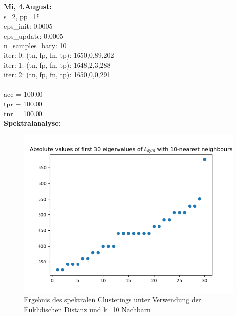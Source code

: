 \documentclass[twoside, 11pt,a4paper]{article}
\numberwithin{equation}{section}
\begin{document}
	
	
	\noindent \textbf{Mi, 4.August:}\\
	s=2, pp=15\\
	eps\_init: 0.0005\\
	eps\_update: 0.0005\\
	n\_samples\_bary: 10\\
	iter: 0:	(tn, fp, fn, tp): 1650,0,89,202\\
	iter: 1:	(tn, fp, fn, tp): 1648,2,3,288\\
	iter: 2:	(tn, fp, fn, tp): 1650,0,0,291\\
	\\
	acc = 100.00\\
	tpr = 100.00\\
	tnr = 100.00\\
	
	\newpage
	\noindent \textbf{Spektralanalyse:}
	\begin{figure}[h]
		\begin{center}
			\includegraphics[width=0.5\textheight]{specClustering_l2_k10.png}
			\caption{Ergebnis des spektralen Clusterings unter Verwendung der Euklidischen Distanz und k=10 Nachbarn}
		\end{center}
	\end{figure}
	
\end{document}
